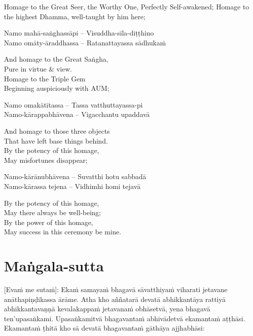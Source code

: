 \begin{english}
  Homage to the Great Seer, the Worthy One, Perfectly Self-awakened; Homage to the highest Dhamma, well-taught by him here;
\end{english}

Namo mahā-saṅghassāpi – Visuddha-sīla-diṭṭhino\\
Namo omāty-āraddhassa – Ratanattayassa sādhukaṁ

\begin{english}
  And homage to the Great Saṅgha,\\
  Pure in virtue \& view.\\
  Homage to the Triple Gem\\
  Beginning auspiciously with AUM;
\end{english}

Namo omakātītassa – Tassa vatthuttayassa-pi\\
Namo-kārappabhāvena – Vigacchantu upaddavā\\

\begin{english}
  And homage to those three objects\\
  That have left base things behind.\\
  By the potency of this homage,\\
  May misfortunes disappear;
\end{english}

Namo-kārānubhāvena – Suvatthi hotu sabbadā\\
Namo-kārassa tejena – Vidhimhi homi tejavā

\begin{english}
  By the potency of this homage,\\
  May there always be well-being;\\
  By the power of this homage,\\
  May success in this ceremony be mine.
\end{english}

\suttaRef{[Thai]}

\section{Maṅgala-sutta}
\label{mangala-sutta}
[Evaṁ me sutaṁ]: Ekaṁ samayaṁ bhagavā sāvatthiyaṁ viharati jetavane anāthapiṇḍikassa ārāme. Atha kho aññatarā devatā abhikkantāya rattiyā abhikkantavaṇṇā kevalakappaṁ jetavanaṁ obhāsetvā, yena bhagavā ten'upasaṅkami. Upasaṅkamitvā bhagavantaṁ abhivādetvā ekamantaṁ aṭṭhāsi. Ekamantaṁ ṭhitā kho sā devatā bhagavantaṁ gāthāya ajjhabhāsi:

